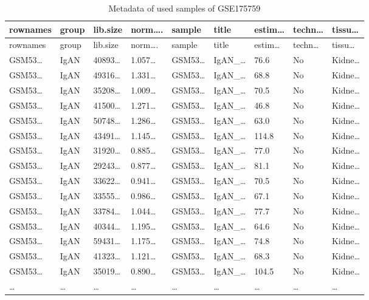\documentclass[
]{article}
\begin{document}
\begin{longtable}[]{@{}lllllllll@{}}
\caption{\label{tab:metadata-of-used-samples-of-GSE175759}Metadata of used samples of GSE175759}\tabularnewline
\toprule
rownames & group & lib.size & norm\ldots. & sample & title & estim\ldots{} & techn\ldots{} & tissu\ldots{}\tabularnewline
\midrule
\endfirsthead
\toprule
rownames & group & lib.size & norm\ldots. & sample & title & estim\ldots{} & techn\ldots{} & tissu\ldots{}\tabularnewline
\midrule
\endhead
GSM53\ldots{} & IgAN & 40893\ldots{} & 1.057\ldots{} & GSM53\ldots{} & IgAN\_\ldots{} & 76.6 & No & Kidne\ldots{}\tabularnewline
GSM53\ldots{} & IgAN & 49316\ldots{} & 1.331\ldots{} & GSM53\ldots{} & IgAN\_\ldots{} & 68.8 & No & Kidne\ldots{}\tabularnewline
GSM53\ldots{} & IgAN & 35208\ldots{} & 1.009\ldots{} & GSM53\ldots{} & IgAN\_\ldots{} & 70.5 & No & Kidne\ldots{}\tabularnewline
GSM53\ldots{} & IgAN & 41500\ldots{} & 1.271\ldots{} & GSM53\ldots{} & IgAN\_\ldots{} & 46.8 & No & Kidne\ldots{}\tabularnewline
GSM53\ldots{} & IgAN & 50748\ldots{} & 1.286\ldots{} & GSM53\ldots{} & IgAN\_\ldots{} & 63.0 & No & Kidne\ldots{}\tabularnewline
GSM53\ldots{} & IgAN & 43491\ldots{} & 1.145\ldots{} & GSM53\ldots{} & IgAN\_\ldots{} & 114.8 & No & Kidne\ldots{}\tabularnewline
GSM53\ldots{} & IgAN & 31920\ldots{} & 0.885\ldots{} & GSM53\ldots{} & IgAN\_\ldots{} & 77.0 & No & Kidne\ldots{}\tabularnewline
GSM53\ldots{} & IgAN & 29243\ldots{} & 0.877\ldots{} & GSM53\ldots{} & IgAN\_\ldots{} & 81.1 & No & Kidne\ldots{}\tabularnewline
GSM53\ldots{} & IgAN & 33622\ldots{} & 0.941\ldots{} & GSM53\ldots{} & IgAN\_\ldots{} & 70.5 & No & Kidne\ldots{}\tabularnewline
GSM53\ldots{} & IgAN & 33555\ldots{} & 0.986\ldots{} & GSM53\ldots{} & IgAN\_\ldots{} & 67.1 & No & Kidne\ldots{}\tabularnewline
GSM53\ldots{} & IgAN & 33784\ldots{} & 1.044\ldots{} & GSM53\ldots{} & IgAN\_\ldots{} & 77.7 & No & Kidne\ldots{}\tabularnewline
GSM53\ldots{} & IgAN & 40344\ldots{} & 1.195\ldots{} & GSM53\ldots{} & IgAN\_\ldots{} & 64.6 & No & Kidne\ldots{}\tabularnewline
GSM53\ldots{} & IgAN & 59431\ldots{} & 1.175\ldots{} & GSM53\ldots{} & IgAN\_\ldots{} & 74.8 & No & Kidne\ldots{}\tabularnewline
GSM53\ldots{} & IgAN & 41323\ldots{} & 1.121\ldots{} & GSM53\ldots{} & IgAN\_\ldots{} & 68.3 & No & Kidne\ldots{}\tabularnewline
GSM53\ldots{} & IgAN & 35019\ldots{} & 0.890\ldots{} & GSM53\ldots{} & IgAN\_\ldots{} & 104.5 & No & Kidne\ldots{}\tabularnewline
\ldots{} & \ldots{} & \ldots{} & \ldots{} & \ldots{} & \ldots{} & \ldots{} & \ldots{} & \ldots{}\tabularnewline
\bottomrule
\end{longtable}
\end{document}
